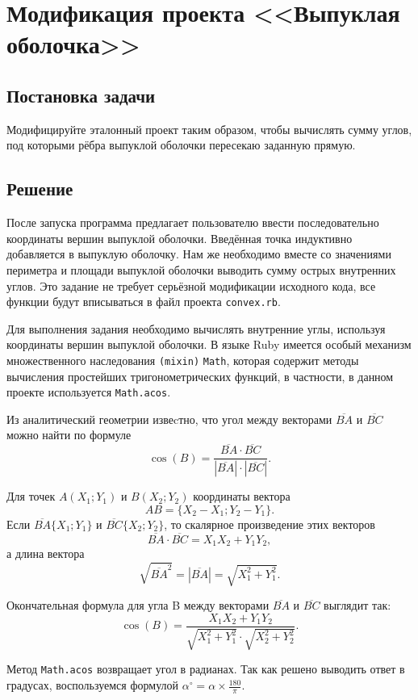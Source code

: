 \section{Модификация проекта <<Выпуклая оболочка>>}

\subsection{Постановка задачи}

Модифицируйте эталонный проект таким образом, чтобы вычислять сумму углов, под которыми рёбра выпуклой оболочки пересекаю заданную прямую.


\subsection{Решение}

После запуска программа предлагает пользователю ввести последовательно координаты вершин выпуклой оболочки. Введённая точка индуктивно добавляется в выпуклую оболочку. Нам же необходимо вместе со значениями периметра и площади выпуклой оболочки выводить сумму острых внутренних углов.
Это задание не требует серьёзной модификации исходного кода, все функции будут вписываться в файл проекта \verb|convex.rb|.

Для выполнения задания необходимо вычислять внутренние углы, используя координаты вершин выпуклой оболочки. В языке Ruby имеется особый механизм множественного наследования \verb|(mixin)| \verb|Math|, которая содержит методы вычисления простейших тригонометрических функций, в частности, в данном проекте используется \verb|Math.acos|.

Из аналитический геометрии извеcтно, что угол между векторами $\overline{BA}$ и $\overline{BC}$ можно найти по формуле 
$$\cos(B) =\dfrac{\overline{BA}\cdot \overline{BC}}{|\overline{BA}|\cdot|\overline{BC}|}.$$

Для точек $A(X_1;Y_1)$ и $B(X_2;Y_2)$ координаты вектора $${AB}=\{X_2-X_1;Y_2-Y_1\}.$$
Если $\overline{BA}\{X_1;Y_1\}$ и $\overline{BC}\{X_2;Y_2\}$, то скалярное произведение этих векторов
$$\overline{BA}\cdot \overline{BC}=X_1X_2+Y_1Y_2,$$ а длина вектора $$\sqrt{\overline{BA}^2}=|\overline{BA}|=\sqrt{X_1^2+Y_1^2}.$$

Окончательная формула для угла B между векторами $\overline{BA}$ и $\overline{BC}$ выглядит так:
$$\cos(B) =\dfrac{X_1X_2+Y_1Y_2}{\sqrt{X_1^2+Y_1^2}\cdot\sqrt{X_2^2+Y_2^2}}.$$

Метод \verb|Math.acos| возвращает угол в радианах. Так как решено выводить ответ в градусах, воспользуемся формулой $\alpha^\circ = \alpha \times \frac{180}{\pi}$.

